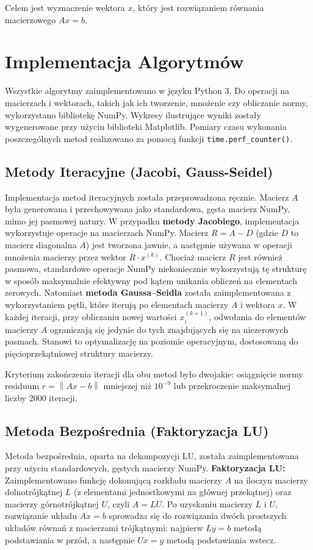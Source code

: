 \documentclass[a4paper, 11pt]{article}
\newcommand{\norm}[1]{\left\lVert#1\right\rVert}
\begin{document}
Celem jest wyznaczenie wektora $x$, który jest rozwiązaniem równania macierzowego $Ax = b$.

\section{Implementacja Algorytmów}
Wszystkie algorytmy zaimplementowano w języku Python 3. Do operacji na macierzach i wektorach, takich jak ich tworzenie, mnożenie czy obliczanie normy, wykorzystano bibliotekę NumPy. Wykresy ilustrujące wyniki zostały wygenerowane przy użyciu biblioteki Matplotlib. Pomiary czasu wykonania poszczególnych metod realizowano za pomocą funkcji \texttt{time.perf\_counter()}.

\subsection{Metody Iteracyjne (Jacobi, Gauss-Seidel)}
Implementacja metod iteracyjnych została przeprowadzona ręcznie. Macierz $A$ była generowana i przechowywana jako standardowa, gęsta macierz NumPy, mimo jej pasmowej natury.
W przypadku \textbf{metody Jacobiego}, implementacja wykorzystuje operacje na macierzach NumPy. Macierz $R = A - D$ (gdzie $D$ to macierz diagonalna $A$) jest tworzona jawnie, a następnie używana w operacji mnożenia macierzy przez wektor $R \cdot x^{(k)}$. Chociaż macierz $R$ jest również pasmowa, standardowe operacje NumPy niekoniecznie wykorzystują tę strukturę w sposób maksymalnie efektywny pod kątem unikania obliczeń na elementach zerowych.
Natomiast \textbf{metoda Gaussa–Seidla} została zaimplementowana z wykorzystaniem pętli, które iterują po elementach macierzy $A$ i wektora $x$. W każdej iteracji, przy obliczaniu nowej wartości $x_i^{(k+1)}$, odwołania do elementów macierzy $A$ ograniczają się jedynie do tych znajdujących się na niezerowych pasmach. Stanowi to optymalizację na poziomie operacyjnym, dostosowaną do pięcioprzekątniowej struktury macierzy.

Kryterium zakończenia iteracji dla obu metod było dwojakie: osiągnięcie normy residuum $r = \norm{Ax - b}$ mniejszej niż $10^{-9}$ lub przekroczenie maksymalnej liczby 2000 iteracji.

\subsection{Metoda Bezpośrednia (Faktoryzacja LU)}
Metoda bezpośrednia, oparta na dekompozycji LU, została zaimplementowana przy użyciu standardowych, gęstych macierzy NumPy.
\textbf{Faktoryzacja LU:} Zaimplementowano funkcję dokonującą rozkładu macierzy $A$ na iloczyn macierzy dolnotrójkątnej $L$ (z elementami jednostkowymi na głównej przekątnej) oraz macierzy górnotrójkątnej $U$, czyli $A = LU$.
Po uzyskaniu macierzy $L$ i $U$, rozwiązanie układu $Ax=b$ sprowadza się do rozwiązania dwóch prostszych układów równań z macierzami trójkątnymi: najpierw $Ly=b$ metodą podstawiania w przód, a następnie $Ux=y$ metodą podstawiania wstecz.
\end{document}

